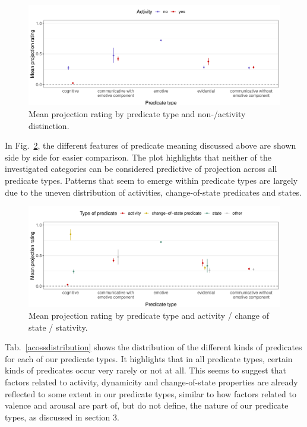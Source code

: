 \documentclass[11pt,fleqn]{article}
\newcommand{\tableref}[1]{Tab.~\ref{#1}}
\newcommand{\figref}[1]{Fig.~\ref{#1}}
\newcommand{\6}{\mbox{$[\hspace*{-.6mm}[$}}
\newcommand{\9}{\mbox{$]\hspace*{-.6mm}]$}}
\begin{document}
\begin{figure}[H]
	\centering
	\includegraphics[width=1\textwidth]{projection-by-predicateType-and-activity}
	\caption{Mean projection rating by predicate type and non-/activity distinction.}
	\label{projact}
\end{figure}

In \figref{projcomb}, the different features of predicate meaning discussed above are shown side by side for easier comparison. The plot highlights that neither of the investigated categories can be considered predictive of projection across all predicate types. Patterns that seem to emerge within predicate types are largely due to the uneven distribution of activities, change-of-state predicates and states.

\begin{figure}[H]
	\centering
	\includegraphics[width=1\textwidth]{projection-by-predicateType-and-stateActivityCoS}
	\caption{Mean projection rating by predicate type and activity / change of state / stativity.}
	\label{projcomb}
\end{figure}

\tableref{acossdistribution} shows the distribution of the different kinds of predicates for each of our predicate types. It highlights that in all predicate types, certain kinds of predicates occur very rarely or not at all. This seems to suggest that factors related to activity, dynamicity and change-of-state properties are already reflected to some extent in our predicate types, similar to how factors related to valence and arousal are part of, but do not define, the nature of our predicate types, as discussed in section 3.
\end{document}
